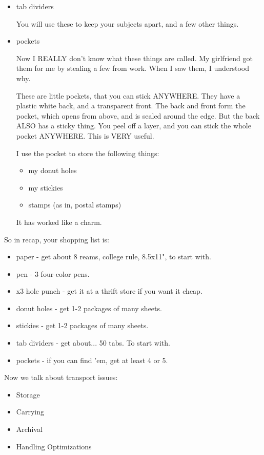 \documentclass[oneside]{book}
\begin{document}
\begin{itemize}
That's basically it. Small idea, but EXTREMELY useful. I'll write more
about it when it comes time to talk about it.

\item tab dividers

You will use these to keep your subjects apart, and a few other
things.

\item pockets

Now I REALLY don't know what these things are called. My girlfriend
got them for me by stealing a few from work. When I saw them, I
understood why.

These are little pockets, that you can stick ANYWHERE. They have a
plastic white back, and a transparent front. The back and front form
the pocket, which opens from above, and is sealed around the edge. But
the back ALSO has a sticky thing. You peel off a layer, and you can
stick the whole pocket ANYWHERE. This is VERY useful.

I use the pocket to store the following things:

\begin{itemize}
\item my donut holes
\item my stickies
\item stamps (as in, postal stamps)
\end{itemize}

It has worked like a charm.
\end{itemize}

So in recap, your shopping list is:

\begin{itemize}
\item paper - get about 8 reams, college rule, 8.5x11", to start with.
\item pen - 3 four-color pens.
\item x3 hole punch - get it at a thrift store if you want it cheap.
\item donut holes - get 1-2 packages of many sheets.
\item stickies - get 1-2 packages of many sheets.
\item tab dividers - get about... 50 tabs. To start with.
\item pockets - if you can find 'em, get at least 4 or 5.
\end{itemize}

Now we talk about transport issues:

\begin{itemize}
\item Storage
\item Carrying
\item Archival
\item Handling Optimizations
\end{itemize}
\end{document}
